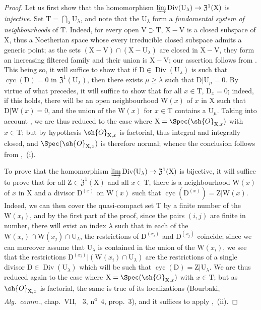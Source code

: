 \begin{proof}
Let us first show that the homomorphism $\varinjlim\operatorname{Div}(\mathrm{U}_\lambda)\to\mathfrak{Z}^1(\mathrm{X})$ is \emph{injective}.
Set $\mathrm{T}=\bigcap_\lambda\mathrm{U}_\lambda$, and note that the $\mathrm{U}_\lambda$ form a \emph{fundamental system of neighbourhoods} of $\mathrm{T}$.
Indeed, for every open $\mathrm{V}\supset\mathrm{T}$, $\mathrm{X}-\mathrm{V}$ is a closed subspace of $\mathrm{X}$, thus a Noetherian space whose every irreducible closed subspace admits a generic point;
as the sets $(\mathrm{X}-\mathrm{V})\cap(\mathrm{X}-\mathrm{U}_\lambda)$ are closed in $\mathrm{X}-\mathrm{V}$, they form an increasing filtered family and their union is $\mathrm{X}-\mathrm{V}$;
our assertion follows from .
This being so, it will suffice to show that if $\mathrm{D}\in\operatorname{Div}(\mathrm{U}_\lambda)$ is such that $\operatorname{cyc}(\mathrm{D})=0$ in $\mathfrak{Z}^1(\mathrm{U}_\lambda)$, then there exists $\mu\geq\lambda$ such that $\mathrm{D}|\mathrm{U}_\mu=0$.
By virtue of what precedes, it will suffice to show that for all $x\in\mathrm{T}$, $\mathrm{D}_x=0$;
indeed, if this holds, there will be an open neighbourhood $\mathrm{W}(x)$ of $x$ in $\mathrm{X}$ such that $\mathrm{D}|\mathrm{W}(x)=0$, and the union of the $\mathrm{W}(x)$ for $x\in\mathrm{T}$ contains a $\mathrm{U}_\mu$.
Taking into account , we are thus reduced to the case where $\mathrm{X}=\Spec(\sh{O}_{\mathrm{X},x})$ with $x\in\mathrm{T}$;
but by hypothesis $\sh{O}_{\mathrm{X},x}$ is factorial, thus integral and integrally closed, and $\Spec(\sh{O}_{\mathrm{X},x})$ is therefore normal;
whence the conclusion follows from ,{}~(i).

To prove that the homomorphism $\varinjlim\operatorname{Div}(\mathrm{U}_\lambda)\to\mathfrak{Z}^1(\mathrm{X})$ is bijective, it will suffice to prove that for all $\mathrm{Z}\in\mathfrak{Z}^1(\mathrm{X})$ and all $x\in\mathrm{T}$, there is a neighbourhood $\mathrm{W}(x)$ of $x$ in $\mathrm{X}$ and a divisor $\mathrm{D}^{(x)}$ on $\mathrm{W}(x)$ such that $\operatorname{cyc}(\mathrm{D}^{(x)})=\mathrm{Z}|\mathrm{W}(x)$.
Indeed, we can then cover the quasi-compact set $\mathrm{T}$ by a finite number of the $\mathrm{W}(x_i)$, and by the first part of the proof, since the pairs $(i,j)$ are finite in number, there will exist an index $\lambda$ such that in each of the $\mathrm{W}(x_i)\cap\mathrm{W}(x_j)\cap\mathrm{U}_\lambda$, the restrictions of $\mathrm{D}^{(x_i)}$ and $\mathrm{D}^{(x_j)}$ coincide;
since we can moreover assume that $\mathrm{U}_\lambda$ is contained in the union of the $\mathrm{W}(x_i)$, we see that the restrictions $\mathrm{D}^{(x_i)}|(\mathrm{W}(x_i)\cap\mathrm{U}_\lambda)$ are the restrictions of a single divisor $\mathrm{D}\in\operatorname{Div}(\mathrm{U}_\lambda)$ which will be such that $\operatorname{cyc}(\mathrm{D})=\mathrm{Z}|\mathrm{U}_\lambda$.
We are thus reduced again to the case where $\mathrm{X}=\Spec(\sh{O}_{\mathrm{X},x})$ with $x\in\mathrm{T}$;
but as $\sh{O}_{\mathrm{X},x}$ is factorial, the same is true of its localizations (Bourbaki, \emph{Alg.\ comm.}, chap.~VII, \textsection~3, n\textsuperscript{o}~4, prop.~3), and it suffices to apply ,{}~(ii).
\end{proof}

